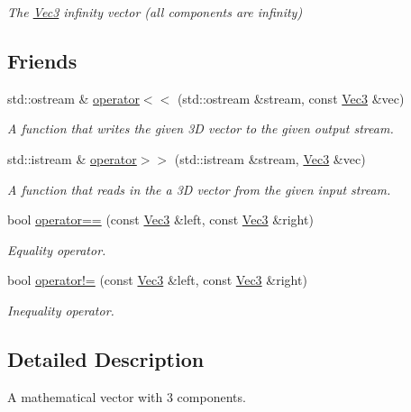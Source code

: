 \begin{DoxyCompactItemize}
\begin{DoxyCompactList}\small\item\em The \hyperlink{structgfxmath_1_1_vec3}{Vec3} infinity vector (all components are infinity) \end{DoxyCompactList}\end{DoxyCompactItemize}
\subsection*{Friends}
\begin{DoxyCompactItemize}
\item 
std\+::ostream \& \hyperlink{structgfxmath_1_1_vec3_a77e412196e0210629d9cb8e2dcaf026b}{operator$<$$<$} (std\+::ostream \&stream, const \hyperlink{structgfxmath_1_1_vec3}{Vec3} \&vec)
\begin{DoxyCompactList}\small\item\em A function that writes the given 3\+D vector to the given output stream. \end{DoxyCompactList}\item 
std\+::istream \& \hyperlink{structgfxmath_1_1_vec3_a3c4d205cb8dd79273c89781cdfa532d2}{operator$>$$>$} (std\+::istream \&stream, \hyperlink{structgfxmath_1_1_vec3}{Vec3} \&vec)
\begin{DoxyCompactList}\small\item\em A function that reads in the a 3\+D vector from the given input stream. \end{DoxyCompactList}\item 
bool \hyperlink{structgfxmath_1_1_vec3_a73bad4468d068dd9b46b313330874c0c}{operator==} (const \hyperlink{structgfxmath_1_1_vec3}{Vec3} \&left, const \hyperlink{structgfxmath_1_1_vec3}{Vec3} \&right)
\begin{DoxyCompactList}\small\item\em Equality operator. \end{DoxyCompactList}\item 
bool \hyperlink{structgfxmath_1_1_vec3_ad5a37b5aca0611e88fb74d9dd01f307a}{operator!=} (const \hyperlink{structgfxmath_1_1_vec3}{Vec3} \&left, const \hyperlink{structgfxmath_1_1_vec3}{Vec3} \&right)
\begin{DoxyCompactList}\small\item\em Inequality operator. \end{DoxyCompactList}\end{DoxyCompactItemize}


\subsection{Detailed Description}
A mathematical vector with 3 components. 

